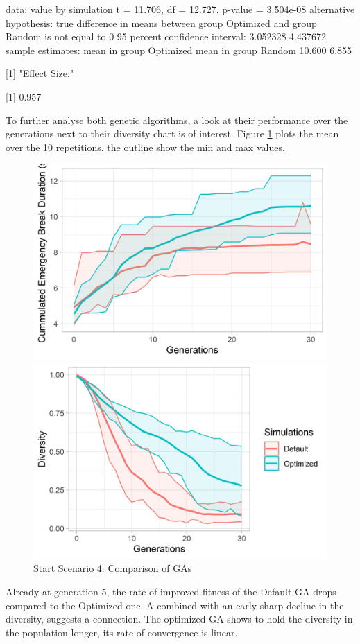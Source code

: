 data:  value by simulation
t = 11.706, df = 12.727, p-value = 3.504e-08
alternative hypothesis: true difference in means between group Optimized and group Random is not equal to 0
95 percent confidence interval:
3.052328 4.437672
sample estimates:
mean in group Optimized    mean in group Random 
10.600                   6.855 

[1] "Effect Size:"

[1] 0.957

To further analyse both genetic algorithms, a look at their performance over the generations next to their diversity chart is of interest. Figure \ref{figure:sim_4_ga_comparison} plots the mean over the 10 repetitions, the outline show the min and max values.

\begin{figure}[ht] 
	\label{figure:sim_4_ga_comparison}
	\begin{minipage}[b]{0.5\linewidth}
		\centering
		\includegraphics[width=1\linewidth]{simulations/evaluation/plots/sim_4_ga_generations} 
	\end{minipage}%
	\begin{minipage}[b]{0.5\linewidth}
		\centering
		\includegraphics[width=1\linewidth]{simulations/evaluation/plots/sim_4_ga_diversity} 
	\end{minipage} 
	\caption{Start Scenario 4: Comparison of GAs}
\end{figure}


Already at generation 5, the rate of improved fitness of the Default GA drops compared to the Optimized one. A combined with an early sharp decline in the diversity, suggests a connection. The optimized GA shows to hold the diversity in the population longer, its rate of convergence is linear.